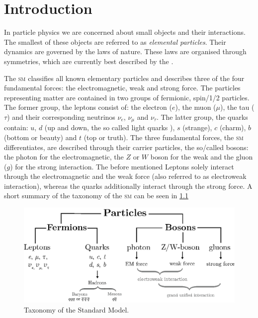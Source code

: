 \documentclass[../../index.tex]{subfiles}
\begin{document}
\chapter{Introduction}
In particle physics we are concerned about small objects and their interactions.
The smallest of these objects are referred to as \textit{elemental particles}.
Their dynamics are governed by the laws of nature. These laws are organised
through symmetries, which are currently best described by the
.

The \textsc{sm} classifies all known elementary particles and describes three of
the four fundamental forces: the electromagnetic, weak and strong force. The
particles representing matter are contained in two groups of fermionic,
spin\-/1/2 particles. The former group, the leptons consist of: the electron
(\(e\)), the muon (\(\mu\)), the tau (\(\tau\)) and their corresponding
neutrinos \(\nu_e\), \(\nu_\mu\) and \(\nu_\tau\). The latter group, the quarks
contain: \(u\), \(d\) (up and down, the so called light quarks ), \(s\)
(strange), \(c\) (charm), \(b\) (bottom or beauty) and \(t\) (top or truth). The
three fundamental forces, the \textsc{sm} differentiates, are described through
their carrier particles, the so\-/called bosons: the photon for the
electromagnetic, the \(Z\) or \(W\) boson for the weak and the gluon (\(g\)) for
the strong interaction. The before mentioned Leptons solely interact through the
electromagnetic and the weak force (also referred to as electroweak
interaction), whereas the quarks additionally interact through the strong force.
A short summary of the taxonomy of the \textsc{sm} can be seen in
\cref{fig:SMTaxonomy}
\begin{figure}
  \centering
  \includegraphics[width=\textwidth]{./images/standardModelTaxonomy.eps}
  \caption{Taxonomy of the Standard Model.}
  \label{fig:SMTaxonomy}
\end{figure}
\end{document}
